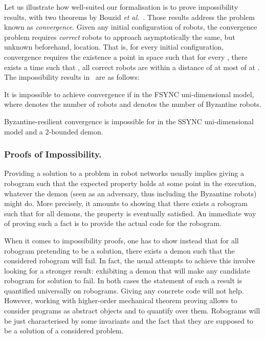 \documentclass[11pt,a4]{llncs}
\begin{document}
Let us illustrate how well-suited our formalisation
is to prove impossibility results, with two theorems by Bouzid \emph{et al.}~\cite{bouzid10tcs}.
Those results address the problem known as \emph{convergence}.
Given any initial configuration of robots, the convergence problem
requires \emph{correct} robots to approach asymptotically the
same, but unknown beforehand, location.
That is, for every initial configuration,
convergence requires the existence a point  in space such that for every , there exists a time
 such that , all correct
robots are within a distance of at most  of  at .
The impossibility results in~\cite{bouzid10tcs} are as follows:
\begin{theorem}\label{thm:demi} It is
  impossible to achieve convergence if  in the
  FSYNC uni-dimensional model,
  where  denotes the number of robots and  denotes the number of
  Byzantine robots.
\end{theorem}

\begin{theorem}\label{thm:tiers}
  Byzantine-resilient convergence is impossible for   in the
  SSYNC
  uni-dimensional model and a \mbox{2-bounded}
  demon.
\end{theorem}

\subsubsection*{Proofs of Impossibility.}\label{sec:impossibility}

Providing a solution to a problem in robot networks usually implies giving
a robogram such that the expected property holds at some point in
the execution, whatever the demon (seen as an adversary, thus including
the Byzantine robots) might do. More precisely, it amounts to showing
that there exists a robogram such that for all demons, the property is
eventually satisfied. An immediate way of proving such a
fact is to provide the actual code for the robogram.

When it comes to impossibility proofs, one has to show instead that
for all robogram pretending to be a solution, there exists a demon
such that the considered robogram will fail. In fact, the usual
attempts to achieve this involve looking for a stronger result:
exhibiting a demon that will make any candidate robogram for solution
to fail. In both cases the statement of such a result is quantified
universally on robograms. Giving any concrete code will not
help. However, working with higher-order mechanical theorem proving
allows to consider programs as abstract objects and to quantify over
them. Robograms will be just characterised by some invariants and the
fact that they are supposed to be a solution of a considered problem.
\end{document}
